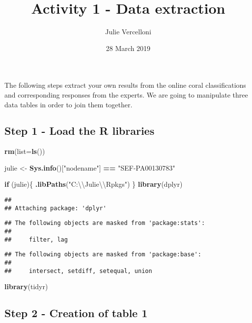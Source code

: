 \documentclass[]{article}
\title{Activity 1 - Data extraction}
\author{Julie Vercelloni}
\date{28 March 2019}
\newenvironment{Shaded}{\begin{snugshade}}{\end{snugshade}}
\newcommand{\KeywordTok}[1]{\textcolor[rgb]{0.13,0.29,0.53}{\textbf{#1}}}
\newcommand{\DataTypeTok}[1]{\textcolor[rgb]{0.13,0.29,0.53}{#1}}
\newcommand{\CharTok}[1]{\textcolor[rgb]{0.31,0.60,0.02}{#1}}
\newcommand{\StringTok}[1]{\textcolor[rgb]{0.31,0.60,0.02}{#1}}
\newcommand{\ControlFlowTok}[1]{\textcolor[rgb]{0.13,0.29,0.53}{\textbf{#1}}}
\newcommand{\OperatorTok}[1]{\textcolor[rgb]{0.81,0.36,0.00}{\textbf{#1}}}
\newcommand{\NormalTok}[1]{#1}
\begin{document}
\maketitle

The following steps extract your own results from the online coral
classifications and corresponding responses from the experts. We are
going to manipulate three data tables in order to join them together.

\subsection{Step 1 - Load the R
libraries}\label{step-1---load-the-r-libraries}

\begin{Shaded}
\begin{Highlighting}[]
\KeywordTok{rm}\NormalTok{(}\DataTypeTok{list=}\KeywordTok{ls}\NormalTok{())}

\NormalTok{julie <-}\StringTok{ }\KeywordTok{Sys.info}\NormalTok{()[}\StringTok{"nodename"}\NormalTok{] }\OperatorTok{==}\StringTok{ "SEF-PA00130783"}

\ControlFlowTok{if}\NormalTok{ (julie)\{}
  \KeywordTok{.libPaths}\NormalTok{(}\StringTok{"C:}\CharTok{\textbackslash{}\textbackslash{}}\StringTok{Julie}\CharTok{\textbackslash{}\textbackslash{}}\StringTok{Rpkgs"}\NormalTok{)}
\NormalTok{\}}
\KeywordTok{library}\NormalTok{(dplyr)}
\end{Highlighting}
\end{Shaded}

\begin{verbatim}
## 
## Attaching package: 'dplyr'
\end{verbatim}

\begin{verbatim}
## The following objects are masked from 'package:stats':
## 
##     filter, lag
\end{verbatim}

\begin{verbatim}
## The following objects are masked from 'package:base':
## 
##     intersect, setdiff, setequal, union
\end{verbatim}

\begin{Shaded}
\begin{Highlighting}[]
\KeywordTok{library}\NormalTok{(tidyr)}
\end{Highlighting}
\end{Shaded}

\subsection{Step 2 - Creation of table
1}\label{step-2---creation-of-table-1}
\end{document}
